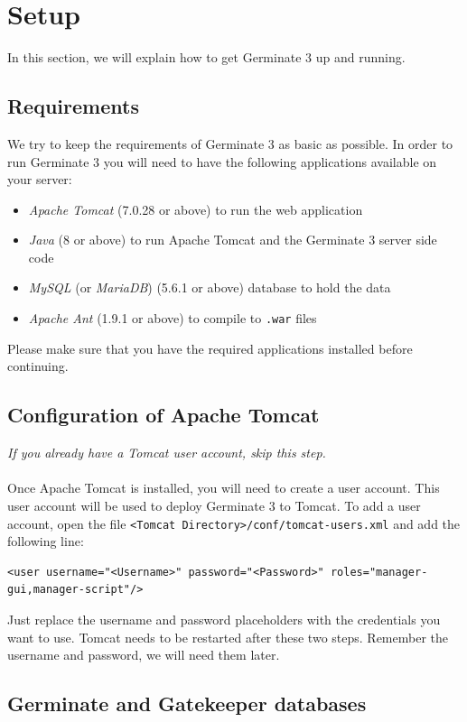 \section{Setup}
In this section, we will explain how to get Germinate 3 up and running.

\subsection{Requirements}
We try to keep the requirements of Germinate 3 as basic as possible. In order to run Germinate 3 you will need to have the following applications available on your server:

\begin{itemize}
	\item \textit{Apache Tomcat} (7.0.28 or above) to run the web application
	\item \textit{Java} (8 or above) to run Apache Tomcat and the Germinate 3 server side code
	\item \textit{MySQL} (or \textit{MariaDB}) (5.6.1 or above) database to hold the data
	\item \textit{Apache Ant} (1.9.1 or above) to compile to \texttt{.war} files
\end{itemize}
\noindent
Please make sure that you have the required applications installed before continuing.

\subsection{Configuration of Apache Tomcat}
\textit{If you already have a Tomcat user account, skip this step.}\\
\\
Once Apache Tomcat is installed, you will need to create a user account. This user account will be used to deploy Germinate 3 to Tomcat. To add a user account, open the file \texttt{<Tomcat Directory>/conf/tomcat-users.xml} and add the following line:

\begin{lstlisting}[style=Xml]
<user username="<Username>" password="<Password>" roles="manager-gui,manager-script"/>
\end{lstlisting}
\noindent
Just replace the username and password placeholders with the credentials you want to use. Tomcat needs to be restarted after these two steps. Remember the username and password, we will need them later.

\subsection{Germinate and Gatekeeper databases}

